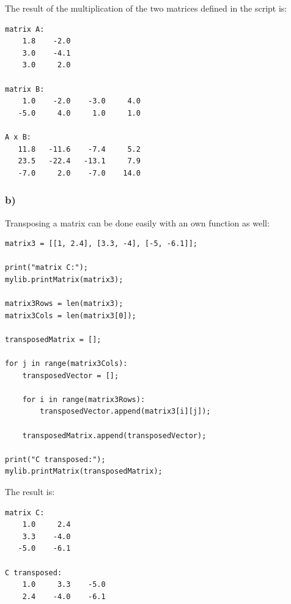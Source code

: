 The result of the multiplication of the two matrices defined in the script is:

\begin{lstlisting}[caption=Result of 1.2 a), keywordstyle=\color{black}]
matrix A:
    1.8    -2.0
    3.0    -4.1
    3.0     2.0

matrix B:
    1.0    -2.0    -3.0     4.0
   -5.0     4.0     1.0     1.0

A x B:
   11.8   -11.6    -7.4     5.2
   23.5   -22.4   -13.1     7.9
   -7.0     2.0    -7.0    14.0
\end{lstlisting}

\subsubsection{b)}

Transposing a matrix can be done easily with an own function as well:

\begin{lstlisting}[caption=Problem 1.2 b)]
matrix3 = [[1, 2.4], [3.3, -4], [-5, -6.1]];

print("matrix C:");
mylib.printMatrix(matrix3);

matrix3Rows = len(matrix3);
matrix3Cols = len(matrix3[0]);

transposedMatrix = [];

for j in range(matrix3Cols):
	transposedVector = [];

	for i in range(matrix3Rows):
		transposedVector.append(matrix3[i][j]);
	
	transposedMatrix.append(transposedVector);

print("C transposed:");
mylib.printMatrix(transposedMatrix);
\end{lstlisting}

The result is:

\begin{lstlisting}[caption=Result of 1.2 b), keywordstyle=\color{black}]
matrix C:
    1.0     2.4
    3.3    -4.0
   -5.0    -6.1

C transposed:
    1.0     3.3    -5.0
    2.4    -4.0    -6.1
\end{lstlisting}
